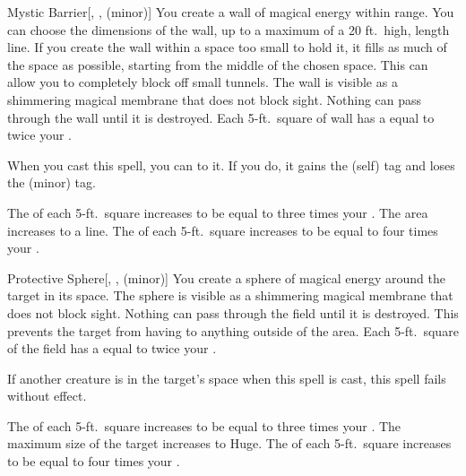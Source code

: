 \lowercase{\hypertarget{spell:Mystic Barrier}{}}\label{spell:Mystic Barrier}
\begin{freeability}[Rank 1]{\hypertarget{spell:Mystic Barrier}{Mystic Barrier}}[, ,  (minor)]
\targetrule
You create a wall of magical energy within \rngmed range.
You can choose the dimensions of the wall, up to a maximum of a 20 ft.\ high, \areamed length line.
If you create the wall within a space too small to hold it, it fills as much of the space as possible, starting from the middle of the chosen space.
This can allow you to completely block off small tunnels.
The wall is visible as a shimmering magical membrane that does not block sight.
Nothing can pass through the wall until it is destroyed.
Each 5-ft.\ square of wall has a  equal to twice your .

When you cast this spell, you can  to it.
If you do, it gains the  (self) tag and loses the  (minor) tag.

\rankline
{} The  of each 5-ft.\ square increases to be equal to three times your .
 The area increases to a \arealarge line.
 The  of each 5-ft.\ square increases to be equal to four times your .
\end{freeability}
\vspace{0.25em}



\lowercase{\hypertarget{spell:Protective Sphere}{}}\label{spell:Protective Sphere}
\begin{freeability}[Rank 1]{\hypertarget{spell:Protective Sphere}{Protective Sphere}}[, ,  (minor)]
You create a sphere of magical energy around the target in its space.
The sphere is visible as a shimmering magical membrane that does not block sight.
Nothing can pass through the field until it is destroyed.
This prevents the target from having  to anything outside of the area.
Each 5-ft.\ square of the field has a  equal to twice your .

If another creature is in the target's space when this spell is cast, this spell fails without effect.

\rankline
{} The  of each 5-ft.\ square increases to be equal to three times your .
 The maximum size of the target increases to Huge.
 The  of each 5-ft.\ square increases to be equal to four times your .
\end{freeability}
\vspace{0.25em}



